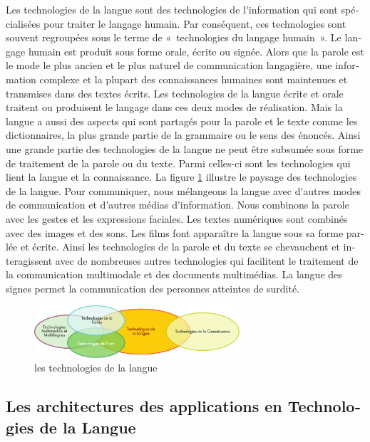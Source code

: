 \begin{french}
\begin{multicols}{2}
Les technologies de la langue sont des technologies de l{\mbox '}information
qui sont spécialisées pour traiter le langage humain. Par conséquent,
ces technologies sont souvent regroupées sous le terme de «~technologies
du langage humain~». Le langage humain est produit sous forme orale,
écrite ou signée. Alors que la parole est le mode le plus ancien et le
plus naturel de communication langagière, une information complexe et
la plupart des connaissances humaines sont maintenues et transmises
dans des textes écrits. Les technologies de la langue écrite et orale
traitent ou produisent le langage dans ces deux modes de
réalisation. Mais la langue a aussi des aspects qui sont partagés pour
la parole et le texte comme les dictionnaires, la plus grande partie
de la grammaire ou le sens des énoncés. Ainsi une grande partie des
technologies de la langue ne peut être subsumée sous forme de
traitement de la parole ou du texte. Parmi celles-ci sont les
technologies qui lient la langue et la connaissance. La figure
\ref{fig:languagetechno} illustre le paysage des technologies de la
langue. Pour communiquer, nous mélangeons la langue avec d{\mbox '}autres
modes de communication et d{\mbox '}autres médias d{\mbox '}information. Nous
combinons la parole avec les gestes et les expressions faciales. Les
textes numériques sont combinés avec des images et des sons. Les films
font apparaître la langue sous sa forme parlée et écrite. Ainsi les
technologies de la parole et du texte se chevauchent et interagissent
avec de nombreuses autres technologies qui facilitent le traitement de
la communication multimodale et des documents multimédias.  La langue
des signes permet la communication des personnes atteintes de surdité.

\begin{figure}[!ht]
\begin{center}
 \includegraphics[width=3.0in]{../_media/french/language_technologies} 
\caption{les technologies de la langue}
\label{fig:languagetechno}
\end{center}
\end{figure}

\subsection{Les architectures des applications en Technologies de la Langue}


\end{multicols}
\end{french}
